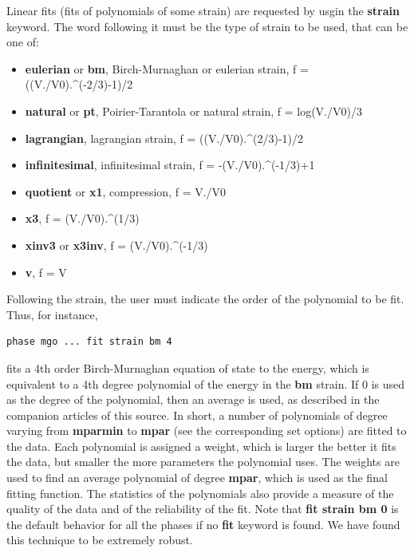 \documentclass[a4paper]{article}
\begin{document}
\begin{itemize}
Linear fits (fits of polynomials of some strain) are requested by
usgin the \textbf{strain} keyword. The word following it must be the
type of strain to be used, that can be one of:
%
\begin{itemize}

\item \textbf{eulerian} or \textbf{bm}, Birch-Murnaghan or eulerian strain,
f = ((V./V0).\textasciicircum{}(-2/3)-1)/2

\item \textbf{natural} or \textbf{pt}, Poirier-Tarantola or natural strain,
f = log(V./V0)/3

\item \textbf{lagrangian}, lagrangian strain, f = ((V./V0).\textasciicircum{}(2/3)-1)/2

\item \textbf{infinitesimal}, infinitesimal strain, f = -(V./V0).\textasciicircum{}(-1/3)+1

\item \textbf{quotient} or \textbf{x1}, compression, f = V./V0

\item \textbf{x3}, f = (V./V0).\textasciicircum{}(1/3)

\item \textbf{xinv3} or \textbf{x3inv}, f = (V./V0).\textasciicircum{}(-1/3)

\item \textbf{v}, f = V

\end{itemize}

Following the strain, the user must indicate the order of the
polynomial to be fit. Thus, for instance,
%
\gibbslist
\begin{lstlisting}
phase mgo ... fit strain bm 4
\end{lstlisting}

fits a 4th order Birch-Murnaghan equation of state to the energy,
which is equivalent to a 4th degree polynomial of the energy in the
\textbf{bm} strain. If 0 is used as the degree of the polynomial, then
an average is used, as described in the companion articles of this
source. In short, a number of polynomials of degree varying from
\textbf{mparmin} to \textbf{mpar} (see the corresponding set options) are
fitted to the data. Each polynomial is assigned a weight, which is
larger the better it fits the data, but smaller the more parameters
the polynomial uses. The weights are used to find an average
polynomial of degree \textbf{mpar}, which is used as the final fitting
function. The statistics of the polynomials also provide a measure
of the quality of the data and of the reliability of the fit. Note
that \textbf{fit strain bm 0} is the default behavior for all the phases
if no \textbf{fit} keyword is found. We have found this technique to be
extremely robust.


\end{itemize}
\end{document}
